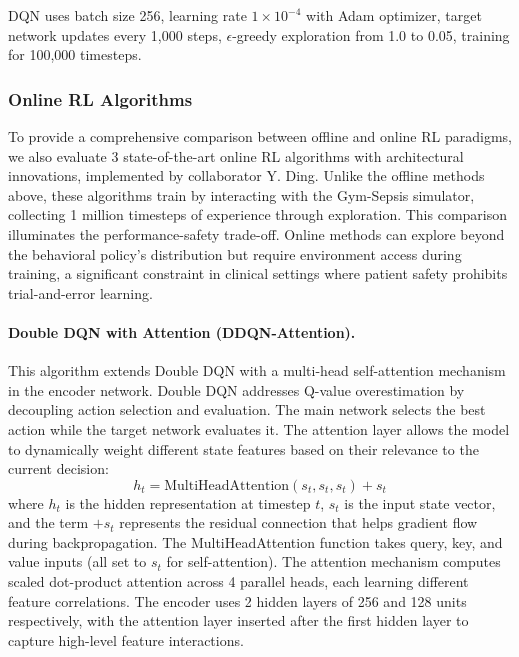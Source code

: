 DQN uses batch size 256, learning rate $1 \times 10^{-4}$ with Adam optimizer, target network updates every 1,000 steps, $\epsilon$-greedy exploration from 1.0 to 0.05, training for 100,000 timesteps.

\subsubsection{Online RL Algorithms}\label{sec:methods:algos:online}

To provide a comprehensive comparison between offline and online RL paradigms, we also evaluate 3 state-of-the-art online RL algorithms with architectural innovations, implemented by collaborator Y. Ding. Unlike the offline methods above, these algorithms train by interacting with the Gym-Sepsis simulator, collecting 1 million timesteps of experience through exploration. This comparison illuminates the performance-safety trade-off. Online methods can explore beyond the behavioral policy's distribution but require environment access during training, a significant constraint in clinical settings where patient safety prohibits trial-and-error learning.

\paragraph{Double DQN with Attention (DDQN-Attention).}
This algorithm extends Double DQN \citep{vanHasselt2016double_dqn} with a multi-head self-attention mechanism in the encoder network. Double DQN addresses Q-value overestimation by decoupling action selection and evaluation. The main network selects the best action while the target network evaluates it. The attention layer allows the model to dynamically weight different state features based on their relevance to the current decision:
\begin{equation}
h_t = \text{MultiHeadAttention}(s_t, s_t, s_t) + s_t
\label{eq:attention}
\end{equation}
where $h_t$ is the hidden representation at timestep $t$, $s_t$ is the input state vector, and the term $+ s_t$ represents the residual connection that helps gradient flow during backpropagation. The MultiHeadAttention function takes query, key, and value inputs (all set to $s_t$ for self-attention). The attention mechanism computes scaled dot-product attention across 4 parallel heads, each learning different feature correlations. The encoder uses 2 hidden layers of 256 and 128 units respectively, with the attention layer inserted after the first hidden layer to capture high-level feature interactions.

